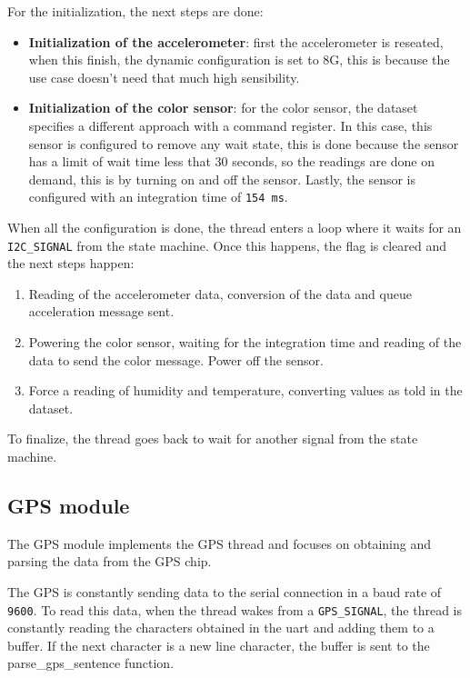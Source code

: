 For the initialization, the next steps are done:
\begin{itemize}
    \item \textbf{Initialization of the accelerometer}: first the accelerometer is reseated, when this finish, the dynamic configuration is set to 8G, this is because the use case doesn't need that much high sensibility.
    \item \textbf{Initialization of the color sensor}: for the color sensor, the dataset specifies a different approach with a command register. In this case, this sensor is configured to remove any wait state, this is done because 
    the sensor has a limit of wait time less that 30 seconds, so the readings are done on demand, this is by turning on and off the sensor. Lastly, the sensor is configured with an integration time of \texttt{154 ms}.
\end{itemize}

When all the configuration is done, the thread enters a loop where it waits for an \texttt{I2C\_SIGNAL} from the state machine. Once this happens, the flag is cleared and the next steps happen:
\begin{enumerate}
    \item Reading of the accelerometer data, conversion of the data and queue acceleration message sent.
    \item Powering the color sensor, waiting for the integration time and reading of the data to send the color message. Power off the sensor.
    \item Force a reading of humidity and temperature, converting values as told in the dataset\cite{Support_Documents_TechnicalDocs_Si7021A20}.
\end{enumerate}

To finalize, the thread goes back to wait for another signal from the state machine.
\clearpage
\subsection{GPS module}
The GPS module implements the GPS thread and focuses on obtaining and parsing the data from the GPS chip.

The GPS is constantly sending data to the serial connection in a baud rate of \texttt{9600}. To read this data, when the thread wakes from a \texttt{GPS\_SIGNAL}, the thread is constantly reading the characters obtained in the \acrshort{uart} and adding them to a 
buffer. If the next character is a new line character, the buffer is sent to the parse\_gps\_sentence function.

